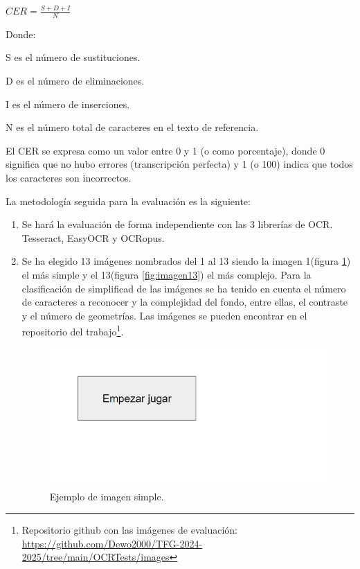 $CER = \frac{S+D+I}{N} $ 

Donde:

S es el número de sustituciones.

D es el número de eliminaciones.

I es el número de inserciones.

N es el número total de caracteres en el texto de referencia.

El CER se expresa como un valor entre 0 y 1 (o como porcentaje), donde 0 significa que no hubo errores (transcripción perfecta) y 1 (o 100) indica que todos los caracteres son incorrectos.

La metodología seguida para la evaluación es la siguiente:

\begin{enumerate}
	\item Se hará la evaluación de forma independiente con las 3 librerías de OCR. Tesseract, EasyOCR y OCRopus.
	\item Se ha elegido 13 imágenes nombrados del 1 al 13 siendo la imagen 1(figura \ref{fig:imagen1}) el más simple y el 13(figura \ref{fig:imagen13}) el más complejo. Para la clasificación de simplificad de las imágenes se ha tenido en cuenta el número de caracteres a reconocer y la complejidad del fondo, entre ellas, el contraste y el número de geometrías.
	Las imágenes se pueden encontrar en el repositorio del trabajo\footnote{Repositorio github con las imágenes de evaluación: \url{https://github.com/Dewo2000/TFG-2024-2025/tree/main/OCRTests/images}}.
\begin{figure}[h]
	\centering
	\begin{minipage}{0.45\textwidth}
		\centering
		\includegraphics[width=\linewidth]{Imagenes/Evaluacion_OCR/1.png}
		\caption{Ejemplo de imagen simple.}
		\label{fig:imagen1}
	\end{minipage}
	\hfill
	\begin{minipage}{0.45\textwidth}

\end{minipage}
\end{figure}
\end{enumerate}

